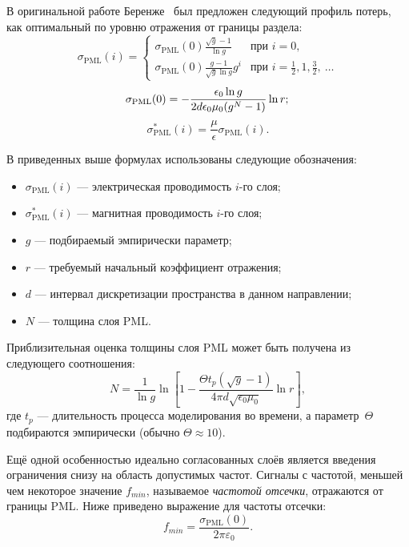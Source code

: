 В оригинальной работе Беренже~\cite{Berenger} был предложен следующий профиль потерь, как оптимальный по уровню отражения от границы раздела:
\begin{equation*}
\sigma_\text{PML}(i) = \left\{
\begin{array}{ll}
    \sigma_\text{PML}(0)\frac{\sqrt{g}-1}{\ln{g}}     & \text{при~} i=0,\\
    \sigma_\text{PML}(0)\frac{g-1}{\sqrt{g}\ln{g}}g^i & \text{при~} i=\frac12,1,\frac32,~\ldots
\end{array}
\right.
\end{equation*}
\begin{equation*}
\sigma_\text{PML}(0) = -\frac{\epsilon_0 \ln{g}} {2 d \epsilon_0\mu_0 (g^N-1)} \ln{r};\\
\end{equation*}
\begin{equation*}
\sigma^{*}_\text{PML}(i) = \frac{\mu}{\epsilon} \sigma_\text{PML}(i).
\end{equation*}

\noindent
В приведенных выше формулах использованы следующие обозначения:
\begin{itemize}[label={}]
\item $ \sigma_\text{PML}(i) $ --- электрическая проводимость $i$-го слоя;
\item $ \sigma^{*}_\text{PML}(i) $ --- магнитная проводимость $i$-го слоя;
\item $g$ --- подбираемый эмпирически параметр;
\item $r$ --- требуемый начальный коэффициент отражения;
\item $d$ --- интервал дискретизации пространства в данном направлении;
\item $N$ --- толщина слоя PML.
\end{itemize}

\noindent
Приблизительная оценка толщины слоя PML может быть получена из следующего
соотношения:
\begin{equation*}
    N= \frac{1}{\ln g} \ln
    \left[
        1 - \frac{\Theta t_p(\sqrt{g}-1)}{4\pi d \sqrt{\epsilon_0\mu_0}} \ln{r}
    \right],
\end{equation*}
где $t_p$ --- длительность процесса моделирования во времени,
а параметр~$\Theta$ подбираются эмпирически (обычно $\Theta\approx10$).

Ещё одной особенностью идеально согласованных слоёв является введения ограничения снизу на область допустимых частот. Сигналы с частотой, меньшей чем некоторое значение $f_{min}$, называемое \emph{частотой отсечки}, отражаются от границы PML. Ниже приведено выражение для частоты отсечки:
\begin{equation*}
    f_{min} = \frac{\sigma_\text{PML}(0)}{2\pi\varepsilon_0}.
\end{equation*}

